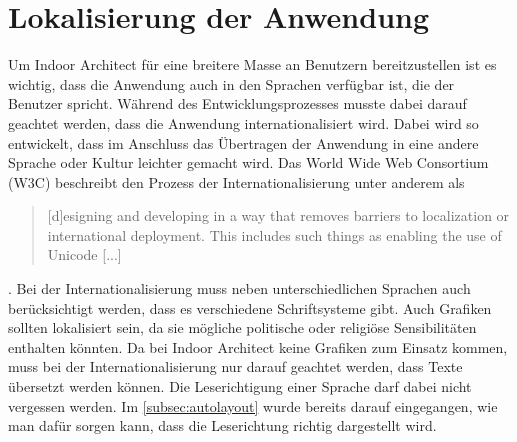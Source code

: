 \section{Lokalisierung der Anwendung}
\label{sec:localizing}
Um Indoor Architect für eine breitere Masse an Benutzern bereitzustellen ist es wichtig, dass die Anwendung auch in den Sprachen verfügbar ist, die der Benutzer spricht.
Während des Entwicklungsprozesses musste dabei darauf geachtet werden, dass die Anwendung internationalisiert wird.
Dabei wird so entwickelt, dass im Anschluss das Übertragen der Anwendung in eine andere Sprache oder Kultur leichter gemacht wird.
Das World Wide Web Consortium (W3C) beschreibt den Prozess der Internationalisierung unter anderem als \blockquote{[d]esigning and developing in a way that removes barriers to localization or international deployment. This includes such things as enabling the use of Unicode [...]} \parencite{ISH2005}.\pbreak%
%
Bei der Internationalisierung muss neben unterschiedlichen Sprachen auch berücksichtigt werden, dass es verschiedene Schriftsysteme gibt.
Auch Grafiken sollten lokalisiert sein, da sie mögliche politische oder religiöse Sensibilitäten enthalten könnten.
Da bei Indoor Architect keine Grafiken zum Einsatz kommen, muss bei der Internationalisierung nur darauf geachtet werden, dass Texte übersetzt werden können.
Die Leserichtigung einer Sprache darf dabei nicht vergessen werden.
Im \autoref{subsec:autolayout} wurde bereits darauf eingegangen, wie man dafür sorgen kann, dass die Leserichtung richtig dargestellt wird.

